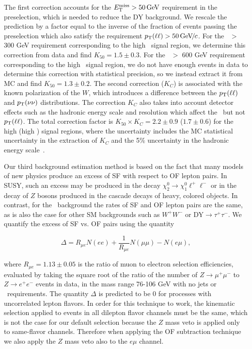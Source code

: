 %
%
The first correction  accounts for the $E_{\mathrm{T}}^{\text{miss}} >  50\,\text{Ge\hspace{-.08em}V}$ requirement in the
preselection, which is needed to  reduce the DY background.  We
rescale  the  prediction by  a  factor equal  to  the  inverse of  the
fraction  of  events  passing  the preselection which  also  satisfy  the
requirement  $p_{\mathrm{T}}(\ell\ell) >  50{\,\text{Ge\hspace{-.08em}V\hspace{-0.16em}/\hspace{-0.08em}}c}$.  
For the \Ht\ $>$ 300 GeV requirement corresponding to the high \MET\ signal region,
we determine this correction from data and find  $K_{50}=1.5 \pm 0.3$.   
For the \Ht\ $>$ 600 GeV requirement corresponding to the high \Ht\ signal region,
we do not have enough events in data to determine this correction with statistical
precision, so we instead extract it from MC and find $K_{50}=1.3 \pm 0.2$.
The  second  correction ($K_C$) is  associated with the  known polarization  of the  $W$, which
introduces a difference  between the $p_{\mathrm{T}}(\ell\ell)$ and $p_{\mathrm{T}}(\nu\nu)$
distributions. The correction $K_C$ also takes into account detector effects such as the hadronic energy
scale and  resolution which affect  the \MET\ but  not $p_{\mathrm{T}}(\ell\ell)$.
The  total correction factor  is $K_{50}  \times K_C  = 2.2  \pm 0.9$ ($1.7 \pm 0.6$) for the
high \MET (high \Ht) signal regions, where the uncertainty includes the MC statistical uncertainty 
in the extraction of $K_C$ and the 5\%  uncertainty in  the hadronic energy scale~\cite{ref:jes}.

Our third background estimation method is based on the fact that many models of new physics
produce an excess of SF with respect to OF lepton pairs. In SUSY, such an excess may be produced
in the decay $\chi_2^0 \to \chi_1^0 \ell^+\ell^-$ or in the decay of $Z$ bosons produced in
the cascade decays of heavy, colored objects. In contrast, for the \ttbar\ background the
rates of SF and OF lepton pairs are the same, as is also the case for other SM backgrounds
such as $W^+W^-$ or DY$\to\tau^+\tau^-$. We quantify the excess of SF vs. OF pairs using the
quantity

\begin{equation}
\label{eq:ofhighpt}
\Delta = R_{\mu e}N(ee) + \frac{1}{R_{\mu e}}N(\mu\mu) - N(e\mu),
\end{equation}

where $R_{\mu e} = 1.13 \pm 0.05$ is the ratio of muon to electron selection efficiencies,
evaluated by taking the square root of the ratio of the number of 
$Z \to \mu^+\mu^-$ to $Z \to e^+e^-$ events in data, in the mass range 76-106 GeV with no jets or 
\met\ requirements. The quantity $\Delta$ is predicted to be 0 for processes with 
uncorrelated lepton flavors. In order for this technique to work, the kinematic selection 
applied to events in all dilepton flavor channels must be the same, which is not the case 
for our default selection because the $Z$ mass veto is applied only to same-flavor channels.
Therefore when applying the OF subtraction technique we also apply the $Z$ mass veto also 
to the $e\mu$ channel. 

